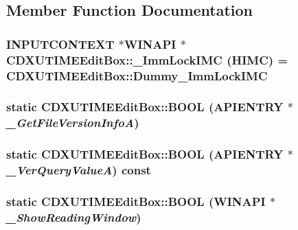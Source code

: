 \subsection{Member Function Documentation}
\hypertarget{class_c_d_x_u_t_i_m_e_edit_box_a5cf2b997f3ea6ca52ce55139373829db}{
\subsubsection[{\_\-ImmLockIMC}]{\setlength{\rightskip}{0pt plus 5cm}INPUTCONTEXT $\ast$WINAPI $\ast$ CDXUTIMEEditBox::\_\-ImmLockIMC ({\bf HIMC}) = CDXUTIMEEditBox::Dummy\_\-ImmLockIMC}}
\label{class_c_d_x_u_t_i_m_e_edit_box_a5cf2b997f3ea6ca52ce55139373829db}
\hypertarget{class_c_d_x_u_t_i_m_e_edit_box_a740dde8f3e869867214a9708eb171664}{
\subsubsection[{BOOL}]{\setlength{\rightskip}{0pt plus 5cm}static {\bf CDXUTIMEEditBox::BOOL} (APIENTRY $\ast$ {\em \_\-GetFileVersionInfoA})}}
\label{class_c_d_x_u_t_i_m_e_edit_box_a740dde8f3e869867214a9708eb171664}
\hypertarget{class_c_d_x_u_t_i_m_e_edit_box_aa9ff3052536b322df532c0a6bd048988}{
\subsubsection[{BOOL}]{\setlength{\rightskip}{0pt plus 5cm}static {\bf CDXUTIMEEditBox::BOOL} (APIENTRY $\ast$ {\em \_\-VerQueryValueA}) const}}
\label{class_c_d_x_u_t_i_m_e_edit_box_aa9ff3052536b322df532c0a6bd048988}
\hypertarget{class_c_d_x_u_t_i_m_e_edit_box_a2b8bfe740199d131e01cf47ca67e1270}{
\subsubsection[{BOOL}]{\setlength{\rightskip}{0pt plus 5cm}static {\bf CDXUTIMEEditBox::BOOL} (WINAPI $\ast$ {\em \_\-ShowReadingWindow})}}
